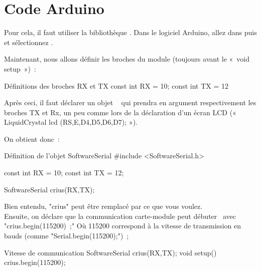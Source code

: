 \section{Code Arduino}


Pour cela, il faut utiliser la bibliothèque .
Dans le logiciel Arduino, allez dans  puis   et sélectionnez .


Maintenant, nous allons définir les broches du module (toujours avant le « void setup ») :

\begin{Cpp}{Définitions des broches RX et TX}
const int RX = 10;
const int TX = 12
\end{Cpp}

Après ceci, il faut déclarer un objet   qui prendra en argument respectivement les broches TX et Rx, un peu comme lors de la déclaration d'un écran LCD (« LiquidCrystal lcd (RS,E,D4,D5,D6,D7); »).

On obtient donc :

\begin{Cpp}{Définition de l'objet SoftwareSerial}
#include <SoftwareSerial.h>

const int RX = 10;
const int TX = 12;

SoftwareSerial crius(RX,TX);
\end{Cpp}

Bien entendu, "crius" peut être remplacé par ce que vous voulez. \\
Ensuite, on déclare que la communication carte-module peut débuter  avec "crius.begin(115200) ;"
Où 115200 correspond à la vitesse de transmission en bauds (comme "Serial.begin(115200);") ;

\begin{Cpp}{Vitesse de communication}
SoftwareSerial crius(RX,TX);
void setup() {
    crius.begin(115200);
}
\end{Cpp}


